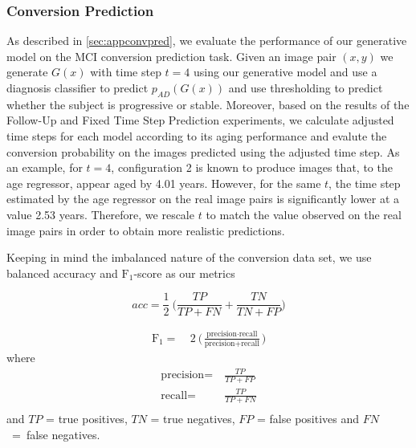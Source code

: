 \subsubsection*{Conversion Prediction}
As described in \autoref{sec:appconvpred}, we evaluate the performance of our generative model on the MCI conversion prediction task. Given an image pair $(x, y)$ we generate $G(x)$ with time step $t = 4$ using our generative model and use a diagnosis classifier to predict $p_{AD}(G(x))$ and use thresholding to predict whether the subject is progressive or stable. Moreover, based on the results of the Follow-Up and Fixed Time Step Prediction experiments, we calculate adjusted time steps for each model according to its aging performance and evalute the conversion probability on the images predicted using the adjusted time step. As an example, for $t = 4$, configuration 2 is known to produce images that, to the age regressor, appear aged by 4.01 years. However, for the same $t$, the time step estimated by the age regressor on the real image pairs is significantly lower at a value 2.53 years. Therefore, we rescale $t$ to match the value observed on the real image pairs in order to obtain more realistic predictions.

Keeping in mind the imbalanced nature of the conversion data set, we use balanced accuracy and $\text{F}_1$-score as our metrics

\begin{equation}
	acc = \frac{1}{2}\ \bigg(\frac{TP}{TP + FN} + \frac{TN}{TN + FP}\bigg)
\end{equation}

\begin{equation}
	\begin{split}
		\text{F}_1 =&\ 2\ \bigg(\frac{\text{precision} \cdot \text{recall}}{\text{precision} + \text{recall}}\bigg)
	\end{split}
\end{equation}
where
\begin{equation*}
	\begin{split}
	\text{precision} =& \ \frac{TP}{TP + FP} \\[8pt]
		\text{recall} =& \ \frac{TP}{TP + FN} \\[8pt]
	\end{split}
\end{equation*}
and $TP$ = true positives, $TN$ = true negatives, $FP$ = false positives and $FN$~=~false negatives.

